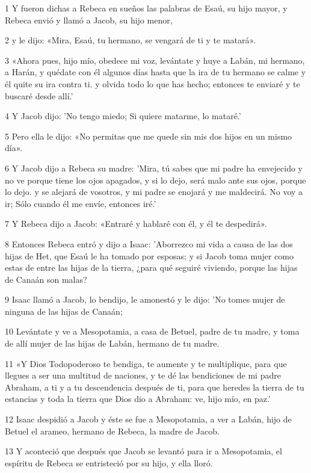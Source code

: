 \par 1 Y fueron dichas a Rebeca en sueños las palabras de Esaú, su hijo mayor, y Rebeca envió y llamó a Jacob, su hijo menor,
\par 2 y le dijo: «Mira, Esaú, tu hermano, se vengará de ti y te matará».
\par 3 «Ahora pues, hijo mío, obedece mi voz, levántate y huye a Labán, mi hermano, a Harán, y quédate con él algunos días hasta que la ira de tu hermano se calme y él quite su ira contra ti. y olvida todo lo que has hecho; entonces te enviaré y te buscaré desde allí.'
\par 4 Y Jacob dijo: 'No tengo miedo; Si quiere matarme, lo mataré.'
\par 5 Pero ella le dijo: «No permitas que me quede sin mis dos hijos en un mismo día».
\par 6 Y Jacob dijo a Rebeca su madre: 'Mira, tú sabes que mi padre ha envejecido y no ve porque tiene los ojos apagados, y si lo dejo, será malo ante sus ojos, porque lo dejo. y se alejará de vosotros, y mi padre se enojará y me maldecirá. No voy a ir; Sólo cuando él me envíe, entonces iré.'
\par 7 Y Rebeca dijo a Jacob: «Entraré y hablaré con él, y él te despedirá».
\par 8 Entonces Rebeca entró y dijo a Isaac: 'Aborrezco mi vida a causa de las dos hijas de Het, que Esaú le ha tomado por esposas; y si Jacob toma mujer como estas de entre las hijas de la tierra, ¿para qué seguiré viviendo, porque las hijas de Canaán son malas?
\par 9 Isaac llamó a Jacob, lo bendijo, le amonestó y le dijo: 'No tomes mujer de ninguna de las hijas de Canaán;
\par 10 Levántate y ve a Mesopotamia, a casa de Betuel, padre de tu madre, y toma de allí mujer de las hijas de Labán, hermano de tu madre.
\par 11 «Y Dios Todopoderoso te bendiga, te aumente y te multiplique, para que llegues a ser una multitud de naciones, y te dé las bendiciones de mi padre Abraham, a ti y a tu descendencia después de ti, para que heredes la tierra de tu estancias y toda la tierra que Dios dio a Abraham: ve, hijo mío, en paz.'
\par 12 Isaac despidió a Jacob y éste se fue a Mesopotamia, a ver a Labán, hijo de Betuel el arameo, hermano de Rebeca, la madre de Jacob.
\par 13 Y aconteció que después que Jacob se levantó para ir a Mesopotamia, el espíritu de Rebeca se entristeció por su hijo, y ella lloró.
